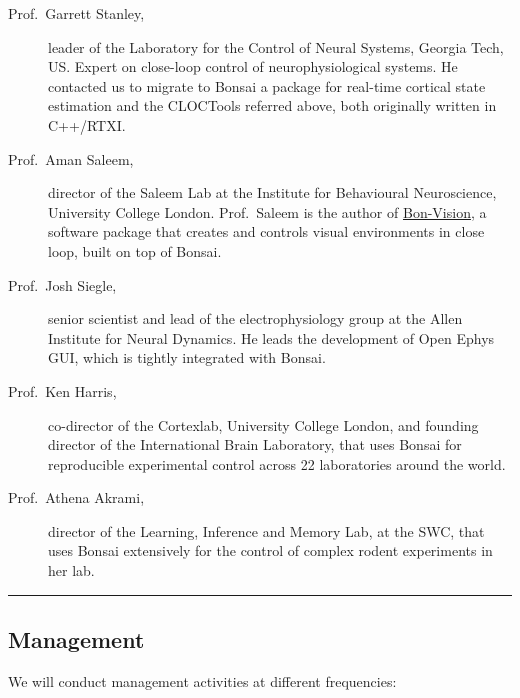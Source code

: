 \begin{description}

    \item[Prof.~Garrett Stanley,] leader of the Laboratory for the Control of
        Neural Systems, Georgia Tech, US. Expert on close-loop control of
        neurophysiological systems. He contacted us to migrate to Bonsai
        a package for real-time cortical state estimation and the CLOCTools
        referred above, both originally written in C++/RTXI.

    \item[Prof.~Aman Saleem,] director of the Saleem Lab at the Institute for
        Behavioural Neuroscience, University College London. Prof.~Saleem is the
        author of \href{https://bonvision.github.io/}{Bon-Vision}, a software
        package that creates and controls visual environments in close loop,
        built on top of Bonsai.

    \item[Prof.~Josh Siegle,] senior scientist and lead of the
        electrophysiology group at the Allen Institute for Neural Dynamics. He
        leads the development of Open Ephys GUI, which is tightly integrated
        with Bonsai.

    \item[Prof.~Ken Harris,] co-director of the Cortexlab, University College
        London, and founding director of the International Brain Laboratory,
        that uses Bonsai for reproducible experimental control across 22
        laboratories around the world.

    \item[Prof.~Athena Akrami,] director of the Learning, Inference and Memory
        Lab, at the SWC, that uses Bonsai extensively for the control of
        complex rodent experiments in her lab.

\end{description}

\noindent\rule{\textwidth}{1pt}
\subsection*{Management}

We will conduct management activities at different frequencies:

